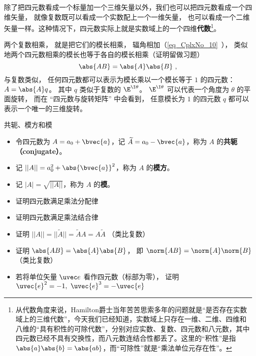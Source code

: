 除了把四元数看成一个标量加一个三维矢量以外，我们也可以把四元数看成一个四维矢量， 就像复数既可以看成一个实数配上一个一维矢量， 也可以看成一个二维矢量一样。这种情况下，四元数实际上就是实数域上的一个四维\textbf{代数}\footnote{从代数角度来说，Hamilton爵士当年苦苦思索多年的问题就是“是否存在实数域上的三维代数”，今天我们已经知道，实数域上只存在一维、二维、四维和八维的“具有积性的可除代数”，分别对应实数、复数、四元数和八元数，其中四元数已经不具有交换性，而八元数连结合性都丢了。这里的“积性”是指 $\abs{a}\abs{b}=\abs{ab}$，而“可除性”就是“乘法单位元存在性”。}。

两个复数相乘， 就是把它们的模长相乘， 辐角相加（\autoref{eq_CplxNo_10}~）， 类似地两个四元数相乘的模长也等于各自的模长相乘（证明留做习题）
\begin{equation}
\abs{AB} = \abs{A}\abs{B}~,
\end{equation}
与复数类似， 任何四元数都可以表示为模长乘以一个模长等于 $1$ 的四元数： $A = \abs{A} q$。 其中 $q$ 类似于复数的 $\E^{\I\theta}$。 $\E^{\I\theta}$ 可以代表一个角度为 $\theta$ 的平面旋转， 而在 “四元数与旋转矩阵” 中会看到， 任意模长为 $1$ 的四元数 $q$ 都可以表示一个唯一的三维旋转。 

\begin{definition}{共轭、模方和模}\label{def_Quat_2}
\begin{itemize}
\item 令四元数为 $A=a_0+\bvec{a}$，记 $\widetilde{A}=a_0-\bvec{a}$，称为 $A$ 的\textbf{共轭（conjugate）}。
\item 记 $||A||=a_0^2+ \abs{\bvec{a}}^2$，称为 $A$ 的\textbf{模方}。
\item 记 $|A|=\sqrt{||A||}$，称为 $A$ 的\textbf{模}。
\end{itemize}
\end{definition}

\begin{exercise}{}\label{exe_Quat_1}
\begin{itemize}
\item 证明四元数满足乘法分配律
\item 证明四元数满足乘法结合律
\item 证明 $||A||=||\widetilde{A}||=\widetilde{A}A=A\widetilde{A}$ （类比复数）
\item 证明 $\abs{AB} = \abs{A}\abs{B}$， 即 $\norm{AB} = \norm{A}\norm{B}$ （类比复数）
\item 若将单位矢量 $\uvec e$ 看作四元数（标部为零）， 证明 $\uvec{e}^2=-1,\ \uvec{e}^3=-\uvec{e}$
\end{itemize}
\end{exercise}

